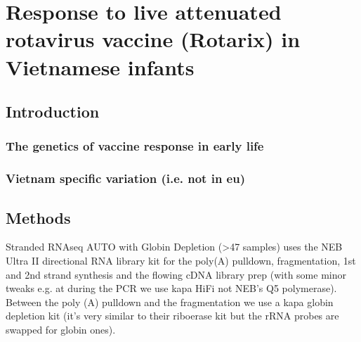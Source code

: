 %
%

\chapter{Response to live attenuated rotavirus vaccine (Rotarix) in Vietnamese infants}

\section{Introduction}

\subsection{The genetics of vaccine response in early life}

\subsection{Vietnam specific variation (i.e. not in eu)}

\section{Methods}

Stranded RNAseq AUTO with Globin Depletion (>47 samples) uses the NEB Ultra
II directional RNA library kit for the poly(A) pulldown, fragmentation, 1st and
2nd strand synthesis and the flowing cDNA library prep (with some minor tweaks
e.g. at during the PCR we use kapa HiFi not NEB's Q5 polymerase). Between the
poly (A) pulldown and the fragmentation we use a kapa globin depletion kit
(it's very similar to their riboerase kit but the rRNA probes are swapped for
globin ones).


